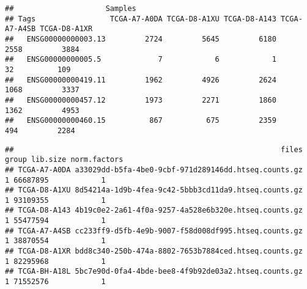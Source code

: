 \documentclass[]{book}
\newenvironment{Shaded}{\begin{snugshade}}{\end{snugshade}}
\newcommand{\KeywordTok}[1]{\textcolor[rgb]{0.13,0.29,0.53}{\textbf{#1}}}
\newcommand{\StringTok}[1]{\textcolor[rgb]{0.31,0.60,0.02}{#1}}
\newcommand{\CommentTok}[1]{\textcolor[rgb]{0.56,0.35,0.01}{\textit{#1}}}
\newcommand{\OperatorTok}[1]{\textcolor[rgb]{0.81,0.36,0.00}{\textbf{#1}}}
\newcommand{\NormalTok}[1]{#1}
\begin{document}
\begin{verbatim}
##                     Samples
## Tags                 TCGA-A7-A0DA TCGA-D8-A1XU TCGA-D8-A143 TCGA-A7-A4SB TCGA-D8-A1XR
##   ENSG00000000003.13         2724         5645         6180         2558         3884
##   ENSG00000000005.5             7            6            1           32          109
##   ENSG00000000419.11         1962         4926         2624         1068         3337
##   ENSG00000000457.12         1973         2271         1860         1362         4953
##   ENSG00000000460.15          867          675         2359          494         2284
\end{verbatim}

\begin{Shaded}
\end{Shaded}

\begin{verbatim}
##                                                             files group lib.size norm.factors
## TCGA-A7-A0DA a33029dd-b5fa-4be0-9cbf-971d289146dd.htseq.counts.gz     1 66687895            1
## TCGA-D8-A1XU 8d54214a-1d9b-4fea-9c42-5bbb3cd11da9.htseq.counts.gz     1 93109355            1
## TCGA-D8-A143 4b19c0e2-2a61-4f0a-9257-4a528e6b320e.htseq.counts.gz     1 55477594            1
## TCGA-A7-A4SB cc233ff9-d5fb-4e9b-9007-f58d008df995.htseq.counts.gz     1 38870554            1
## TCGA-D8-A1XR bdd8c340-250b-474a-8802-7653b7884ced.htseq.counts.gz     1 82295968            1
## TCGA-BH-A18L 5bc7e90d-0fa4-4bde-bee8-4f9b92de03a2.htseq.counts.gz     1 71552576            1
\end{verbatim}

\begin{Shaded}
\end{Shaded}
\end{document}
